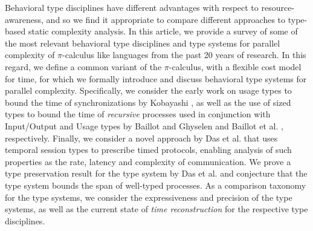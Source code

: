 



Behavioral type disciplines have different advantages with respect to resource-awareness, and so we find it appropriate to compare different approaches to type-based static complexity analysis. In this article, we provide a survey of some of the most relevant behavioral type disciplines and type systems for parallel complexity of $\pi$-calculus like languages from the past 20 years of research. In this regard, we define a common variant of the $\pi$-calculus, with a flexible cost model for time, for which we formally introduce and discuss behavioral type systems for parallel complexity. Specifically, we consider the early work on usage types to bound the time of synchronizations by Kobayashi \cite{Kobayashi2000}, as well as the use of sized types to bound the time of \textit{recursive} processes used in conjunction with Input/Output and Usage types by Baillot and Ghyselen \cite{BaillotGhyselen2021} and Baillot et al. \cite{BaillotEtAl2021}, respectively. Finally, we consider a novel approach by Das et al. \cite{DasEtAl2018} that uses temporal session types to prescribe timed protocols, enabling analysis of such properties as the rate, latency and complexity of communication. We prove a type preservation result for the type system by Das et al. and conjecture that the type system bounds the span of well-typed processes. As a comparison taxonomy for the type systems, we consider the expressiveness and precision of the type systems, as well as the current state of \textit{time reconstruction} for the respective type disciplines. \\

